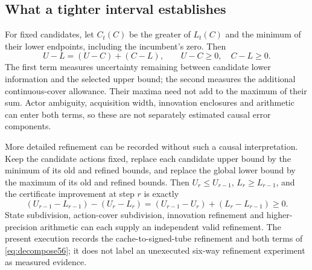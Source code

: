 \subsection{What a tighter interval establishes}
For fixed candidates, let $C_t(C)$ be the greater of $L_t(C)$ and the minimum of their lower endpoints, including the incumbent's zero. Then
\begin{equation}\label{eq:decompose56}
 U-L=(U-C)+(C-L),\qquad U-C\ge0,\quad C-L\ge0.
\end{equation}
The first term measures uncertainty remaining between candidate lower information and the selected upper bound; the second measures the additional continuous-cover allowance. Their maxima need not add to the maximum of their sum. Actor ambiguity, acquisition width, innovation enclosures and arithmetic can enter both terms, so these are not separately estimated causal error components.

More detailed refinement can be recorded without such a causal interpretation. Keep the candidate actions fixed, replace each candidate upper bound by the minimum of its old and refined bounds, and replace the global lower bound by the maximum of its old and refined bounds. Then $U_r\le U_{r-1}$, $L_r\ge L_{r-1}$, and the certificate improvement at step $r$ is exactly
\[
 (U_{r-1}-L_{r-1})-(U_r-L_r)
 =(U_{r-1}-U_r)+(L_r-L_{r-1})\ge0.
\]
State subdivision, action-cover subdivision, innovation refinement and higher-precision arithmetic can each supply an independent valid refinement. The present execution records the cache-to-signed-tube refinement and both terms of \eqref{eq:decompose56}; it does not label an unexecuted six-way refinement experiment as measured evidence.
